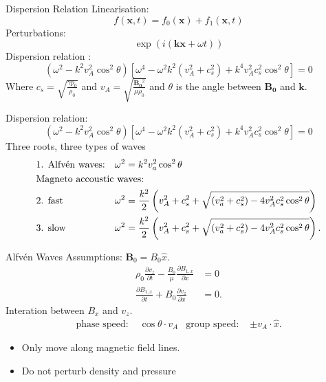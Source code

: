 \documentclass{beamer}
\begin{document}
\begin{frame}{Dispersion Relation}
    Linearisation:
        \begin{equation*}
            f(\mathbf{x},t) = f_0(\mathbf{x}) + f_1(\mathbf{x},t)
        \end{equation*}
    Perturbations:
        \begin{equation*}
            \exp(i(\mathbf{kx} + \omega t))
        \end{equation*}
	Dispersion relation \cite{Fitzpatricknotes}:
        \begin{equation*}
	        (\omega^2 - k^2 v_A^2 \cos^2 \theta)\left[ \omega^{4} - \omega^2k^2(v_A^2 + c_s^2) + k^{4}v_A^2c_s^2\cos^2\theta \right]  = 0
        \end{equation*}
        Where $c_s = \sqrt{\frac{\gamma p_0}{\rho_0}}$ and $v_A = \sqrt{\frac{\mathbf{B_0}^2}{\mu\rho_0}}$ and $\theta$ is the angle between $\mathbf{B_0}$ and $\mathbf{k}$.
\end{frame}
\begin{frame}
    Dispersion relation:
        \begin{equation*}
	        (\omega^2 - k^2 v_A^2 \cos^2 \theta)\left[ \omega^{4} - \omega^2k^2(v_A^2 + c_s^2) + k^{4}v_A^2c_s^2\cos^2\theta \right]  = 0
        \end{equation*}
Three roots, three types of waves
\begin{align*}
&\text{1. Alfv\'en waves:}	& \omega^2 &= k^2 v_a^2 \cos^2 \theta\\
&\text{Magneto accoustic waves:}\hspace{-4cm}\\
&\text{2. fast} 
& \omega^2 &= \frac{k^2}{2}\left( v_A^2 + c_s^2 + \sqrt{(v_a^2 + c_s^2) - 4 v_A^2 c_s^2 \cos^2\theta}  \right) \\
& \text{3. slow} & 
	\omega^2 &= \frac{k^2}{2}\left( v_A^2 + c_s^2 + \sqrt{(v_a^2 + c_s^2) - 4 v_A^2 c_s^2 \cos^2\theta}  \right) 
.\end{align*}
\end{frame}
\begin{frame}{Alfv\'en Waves}
	Assumptions: $\mathbf B_0 = B_0 \hat{x}$. 
	\begin{align*}
		\rho_0 \frac{\partial v_z}{\partial t}  - \frac{B_0}{\mu}\frac{\partial B_{1, x}}{\partial x}  &= 0 \\
		\frac{\partial B_{1,x}}{\partial t}  + B_0 \frac{\partial v_z}{\partial x} &= 0 
	.\end{align*}
	Interation between $B_x$ and $v_z$. 
	\begin{align*}
		\text{phase speed: } & \cos\theta \cdot v_A & \text{group speed: } & \pm v_A \cdot \hat{x}
	.\end{align*}
	\begin{itemize}
		\item Only move along magnetic field lines.
		\item Do not perturb density and pressure
	\end{itemize}
\end{frame}
\end{document}

